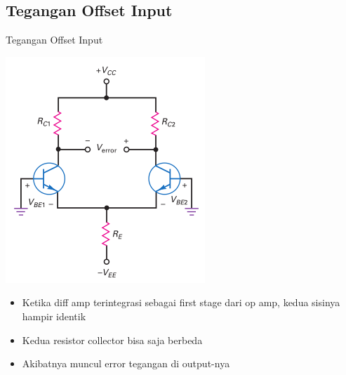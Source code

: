\documentclass[aspectratio=169]{beamer}
\begin{document}
\subsection{Tegangan Offset Input}
\begin{frame}{Tegangan Offset Input}
	\begin{multicols}{2}
		\begin{center}
			\includegraphics[height=0.7\textheight]{gambar/01.diff-amp/01.different_collector_resistors_produce_error_when_bases_are_grounded}
		\end{center}
		\columnbreak
		\begin{itemize}
			\item Ketika diff amp terintegrasi sebagai first stage dari op amp, kedua sisinya hampir identik
			\item Kedua resistor collector bisa saja berbeda
			\item Akibatnya muncul error tegangan di output-nya
		\end{itemize}
	\end{multicols}
\end{frame}
\end{document}
